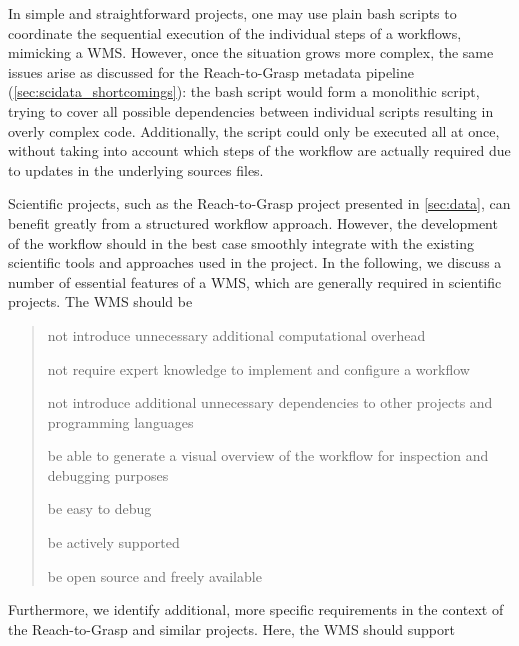 In simple and straightforward projects, one may use plain bash scripts to coordinate the sequential execution of the individual steps of a workflows, mimicking a WMS. However, once the situation grows more complex, the same issues arise as discussed for the Reach-to-Grasp metadata pipeline (\cref{sec:scidata_shortcomings}): the bash script would form a monolithic script, trying to cover all possible dependencies between individual scripts resulting in overly complex code. Additionally, the script could only be executed all at once, without taking into account which steps of the workflow are actually required due to updates in the underlying sources files.

Scientific projects, such as the Reach-to-Grasp project presented in \cref{sec:data}, can benefit greatly from a structured workflow approach. However, the development of the workflow should in the best case smoothly integrate with the existing scientific tools and approaches used in the project. In the following, we discuss a number of essential features of a WMS, which are generally required in scientific projects. The WMS should be
\begin{quote}
\begin{description}
 \setlength{\itemsep}{5pt}
 \setlength{\parskip}{0pt}
 \setlength{\parsep}{0pt}
 \item[slim] not introduce unnecessary additional computational overhead
 \item[easy]  not require expert knowledge to implement and configure a workflow
 \item[standalone] not introduce additional unnecessary dependencies to other projects and programming languages
  \item[visual] be able to generate a visual overview of the workflow for inspection and debugging purposes
  \item[debuggable] be easy to debug
  \item[active] be actively supported
  \item[open] be open source and freely available\\
\end{description}
\end{quote}
Furthermore, we identify additional, more specific requirements in the context of the Reach-to-Grasp and similar projects. Here, the WMS should support
